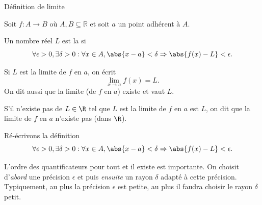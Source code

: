 \begin{frame}{Définition de limite}%
  \begin{definition}
    Soit $f : A \to B$ où $A, B \subseteq \mathbb R$ et soit $a$ un point adhérent à $A$.\pause{}

    Un nombre réel $L$ est la  si
    \begin{equation*}
      \forall \epsilon > 0, \exists \delta > 0 : \forall x \in A, \abs{x-a} < \delta \Rightarrow \abs{f(x)-L} < \epsilon.
    \end{equation*}
  \end{definition}\pause

  Si $L$ est la limite de $f$ en $a$, on écrit
  \begin{equation}
    \lim_{x \to a} f(x) = L.
  \end{equation}
  On dit aussi que la limite (de \(f\) en \(a\)) existe et vaut \(L\).\pause

  \begin{definition}
    S'il n'existe pas de $L \in \R$ tel que $L$ est la limite de $f$ en $a$ est $L$, on dit que la limite de $f$ en $a$ n'existe pas (dans $\R$).
  \end{definition}
\end{frame}
 
\begin{frame}
  \begin{definition}
    Ré-écrivons la définition
    \begin{equation*}
      \forall \epsilon > 0, \exists \delta > 0 : \forall x \in A, \abs{x-a} < \delta \Rightarrow \abs{f(x)-L} < \epsilon.
    \end{equation*}
  \end{definition}\pause

  \begin{remark}
    L'ordre des quantificateurs \og pour tout\fg{} et \og il existe\fg{} est importante. On choisit d'\emph{abord} une précision $\epsilon$ et puis \emph{ensuite} un rayon $\delta$ adapté à cette précision. Typiquement, au plus la précision $\epsilon$ est petite, au plus il faudra choisir le rayon $\delta$ petit.
  \end{remark}
\end{frame}


